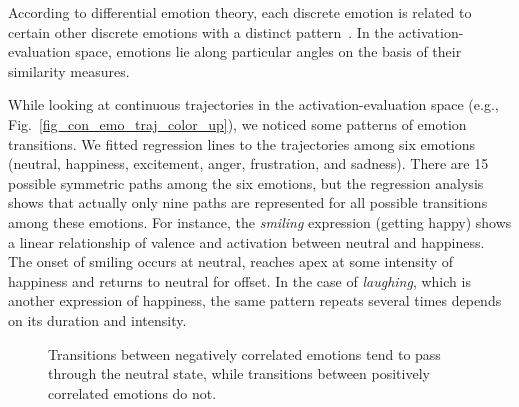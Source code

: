 \documentclass[10pt,journal,cspaper,compsoc]{IEEEtran}
\begin{document}
According to differential emotion theory, each discrete emotion is related to certain other discrete emotions with a distinct pattern~\cite{blumberg1991patterns}. In the activation-evaluation space, emotions lie along particular angles on the basis of their similarity measures.


While looking at  continuous trajectories in the activation-evaluation space (e.g., Fig.~\ref{fig_con_emo_traj_color_up}), we noticed some patterns of emotion transitions. We fitted regression lines to the trajectories among six emotions (neutral, happiness, excitement, anger, frustration, and sadness). There are 15 possible symmetric paths among the six emotions, but the regression analysis shows that actually only nine paths are represented for all possible transitions among these emotions. For instance, the \emph{smiling} expression (getting happy) shows a linear relationship of valence and activation between neutral and happiness. The onset of smiling occurs at neutral, reaches apex at some intensity of happiness and returns to neutral for offset. In the case of \emph{laughing}, which is another expression of happiness, the same pattern repeats several times depends on its duration and intensity.

\begin{figure}[!htp]
\begin{center}
\end{center}
\caption{Transitions between negatively correlated emotions tend to pass through the neutral state, while transitions between positively correlated emotions do not.}
\label{fig_e1_to_e2}
\end{figure}
\end{document}
